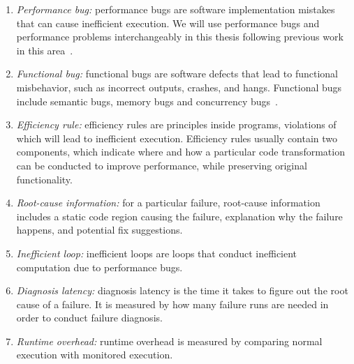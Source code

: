 \begin{nomenclature}

\begin{enumerate}

\item{{\textit{Performance bug:}}}
performance bugs are software implementation mistakes 
that can cause inefficient execution. 
We will use performance bugs
and performance problems interchangeably in this thesis 
following previous work in this 
area~\citep{Alabama,perf.fse10}.


\item{{\textit{Functional bug:}}}
functional bugs are software defects that lead to functional misbehavior, 
such as incorrect outputs, crashes, and hangs. 
Functional bugs include semantic bugs, 
memory bugs and concurrency bugs~\citep{LiASID06}.



\item{{\textit{Efficiency rule:}}}
efficiency rules are principles inside programs, 
violations of which will lead to inefficient execution. 
Efficiency rules usually contain two components, 
which indicate where and how a particular code transformation 
can be conducted to improve performance, 
while preserving original functionality. 


\item{{\textit{Root-cause information:}}}
for a particular failure, root-cause information includes a static code region causing the failure, 
explanation why the failure happens, and potential fix suggestions.


\item{{\textit{Inefficient loop:}}}
inefficient loops are loops that conduct inefficient computation due to performance bugs.

\item{{\textit{Diagnosis latency:}}}
diagnosis latency is the time it takes to figure out the root cause of a failure.                    
It is measured by
how many failure runs are needed in order to conduct failure diagnosis. 


\item{{\textit{Runtime overhead:}}}
runtime overhead is measured by comparing normal execution with monitored execution. 




\end{enumerate}
\end{nomenclature}

\begin{abstract}
  
\end{abstract}

\clearpage{}

